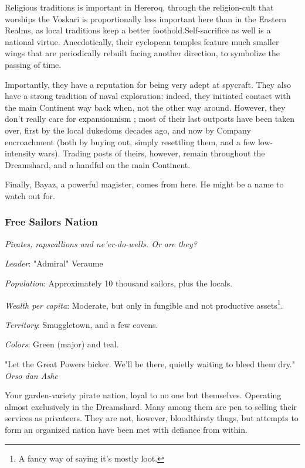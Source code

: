 Religious traditions is important in Hereroq, through the religion-cult that worships the Voskari is proportionally less important here than in the Eastern Realms, as local traditions keep a better foothold.Self-sacrifice as well is a national virtue. Anecdotically, their cyclopean temples feature much smaller wings that are periodically rebuilt facing another direction, to symbolize the passing of time.

Importantly, they have a reputation for being very adept at spycraft. They also have a strong tradition of naval exploration: indeed, they initiated contact with the main Continent way back when, not the other way around. However, they don't really care for expansionnism ; most of their last outposts have been taken over, first by the local dukedoms decades ago, and now by Company encroachment (both by buying out, simply resettling them, and a few low-intensity wars). Trading posts of theirs, however, remain throughout the Dreamshard, and a handful on the main Continent. 

Finally, Bayaz, a powerful magister, comes from here. He might be a name to watch out for.


\subsubsection{Free Sailors Nation}

\textit{Pirates, rapscallions and ne'er-do-wells. Or are they?}

\textit{Leader}: "Admiral" Veraume

\textit{Population}: Approximately 10 thousand sailors, plus the locals.

\textit{Wealth per capita}: Moderate, but only in fungible and not productive assets\footnote{A fancy way of saying it's mostly loot.}.

\textit{Territory}: Smuggletown, and a few covens.
    
\textit{Colors}: Green (major) and teal.

\begin{rpg-quotebox}
    "Let the Great Powers bicker. We'll be there, quietly waiting to bleed them dry." \\ \textendash \textit{Orso dan Ashe}
\end{rpg-quotebox}

Your garden-variety pirate nation, loyal to no one but themselves. Operating almost exclusively in the Dreamshard. Many among them are pen to selling their services as privateers. They are not, however, bloodthirsty thugs, but attempts to form an organized nation have been met with defiance from within.

